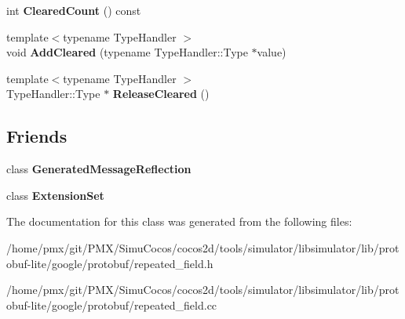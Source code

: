 \begin{DoxyCompactItemize}
\mbox{\label{classgoogle_1_1protobuf_1_1internal_1_1RepeatedPtrFieldBase_a714b26caffd7f143df046c3ef1f893dd}} 
int {\bfseries Cleared\+Count} () const
\item 
\mbox{\label{classgoogle_1_1protobuf_1_1internal_1_1RepeatedPtrFieldBase_a9a801a51aa2fff180fcbefb0add200a7}} 
{\footnotesize template$<$typename Type\+Handler $>$ }\\void {\bfseries Add\+Cleared} (typename Type\+Handler\+::\+Type $\ast$value)
\item 
\mbox{\label{classgoogle_1_1protobuf_1_1internal_1_1RepeatedPtrFieldBase_a8b6deba26718a95be00790114c691ae4}} 
{\footnotesize template$<$typename Type\+Handler $>$ }\\Type\+Handler\+::\+Type $\ast$ {\bfseries Release\+Cleared} ()
\end{DoxyCompactItemize}
\subsection*{Friends}
\begin{DoxyCompactItemize}
\item 
\mbox{\label{classgoogle_1_1protobuf_1_1internal_1_1RepeatedPtrFieldBase_a24299c598a1a2c684def901f36500928}} 
class {\bfseries Generated\+Message\+Reflection}
\item 
\mbox{\label{classgoogle_1_1protobuf_1_1internal_1_1RepeatedPtrFieldBase_af0c54745c1197437f23bc64f62011e5a}} 
class {\bfseries Extension\+Set}
\end{DoxyCompactItemize}


The documentation for this class was generated from the following files\+:\begin{DoxyCompactItemize}
\item 
/home/pmx/git/\+P\+M\+X/\+Simu\+Cocos/cocos2d/tools/simulator/libsimulator/lib/protobuf-\/lite/google/protobuf/repeated\+\_\+field.\+h\item 
/home/pmx/git/\+P\+M\+X/\+Simu\+Cocos/cocos2d/tools/simulator/libsimulator/lib/protobuf-\/lite/google/protobuf/repeated\+\_\+field.\+cc\end{DoxyCompactItemize}
